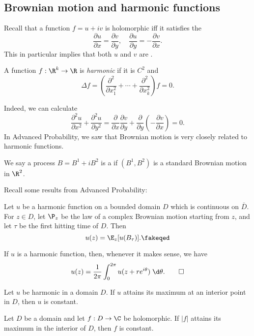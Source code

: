\documentclass[a4paper]{article}
\begin{document}
\subsection{Brownian motion and harmonic functions}
Recall that a function $f = u + iv$ is holomorphic iff it satisfies the 
\[
  \frac{\partial u}{\partial x} = \frac{\partial v}{\partial y},\quad \frac{\partial u}{\partial y} = - \frac{\partial v}{\partial x}.
\]
This in particular implies that both $u$ and $v$ are .
\begin{defi}
  A function $f: \R^k \to \R$ is \emph{harmonic} if it is $C^2$ and
  \[
    \Delta f = \left(\frac{\partial^2}{\partial x_1^2} + \cdots + \frac{\partial^2}{\partial x_k^2}\right) f = 0.
  \]
\end{defi}
Indeed, we can calculate
\[
  \frac{\partial^2 u}{\partial x^2} + \frac{\partial^2 u}{\partial y^2} = \frac{\partial}{\partial x} \frac{\partial v}{\partial y} + \frac{\partial}{\partial y} \left(- \frac{\partial v}{\partial x}\right) = 0.
\]
In Advanced Probability, we saw that Brownian motion is very closely related to harmonic functions.
\begin{defi}
  We say a process $B = B^1 + i B^2$ is a  if $(B^1, B^2)$ is a standard Brownian motion in $\R^2$.
\end{defi}

Recall some results from Advanced Probability:
\begin{thm}
  Let $u$ be a harmonic function on a bounded domain $D$ which is continuous on $\bar{D}$. For $z \in D$, let $\P_z$ be the law of a complex Brownian motion starting from $z$, and let $\tau$ be the first hitting time of $D$. Then
  \[
    u(z) = \E_z[u(B_\tau)].\fakeqed
  \]
\end{thm}

\begin{cor}
  If $u$ is a harmonic function, then, whenever it makes sense, we have
  \[
    u(z) = \frac{1}{2\pi} \int_0^{2\pi} u(z + re^{i\theta})\;\d \theta.\qedhere
  \]
\end{cor}
\begin{cor}
  Let $u$ be harmonic in a domain $D$. If $u$ attains its maximum at an interior point in $D$, then $u$ is constant.
\end{cor}

\begin{cor}
  Let $D$ be a domain and let $f: D \to \C$ be holomorphic. If $|f|$ attains its maximum in the interior of $D$, then $f$ is constant.
\end{cor}
\end{document}
